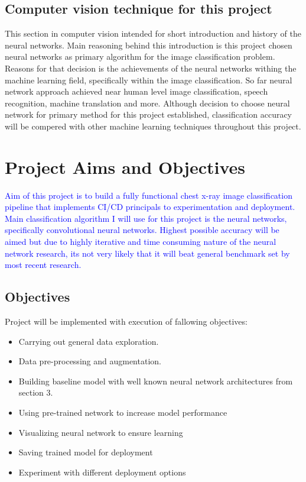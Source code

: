 \documentclass[12pt, twoside, a4paper]{article}
\begin{document}
\subsection{Computer vision technique for this project}
This section in computer vision intended for short introduction and history of the neural networks. Main reasoning behind this introduction is this project chosen neural networks as primary algorithm for the image classification problem. Reasons for that decision is the achievements of the neural networks withing the machine learning field, specifically within the image classification. So far neural network approach achieved near human level image classification, speech recognition, machine translation and more. Although decision to choose neural network for primary method for this project established, classification accuracy will be compered with other machine learning techniques throughout this project.
\clearpage

\section{Project Aims and Objectives}
\textcolor{blue}{Aim of this project is to build a fully functional chest x-ray image classification pipeline that implements CI/CD principals to experimentation and deployment. Main classification algorithm I will use for this project is the neural networks, specifically convolutional neural networks. Highest possible accuracy will be aimed but due to highly iterative and time consuming nature of the neural network research, its not very likely that it will beat general benchmark set by most recent research.}

\subsection{Objectives}
Project will be implemented with execution of fallowing objectives:
\begin{itemize}
    \color{blue}
    \item Carrying out general data exploration.
    \item Data pre-processing and augmentation.
    \item Building baseline model with well known neural network architectures from section 3.
    \item Using pre-trained network to increase model performance
    \item Visualizing neural network to ensure learning 
    \item Saving trained model for deployment
    \item Experiment with different deployment options
\end{itemize}
\clearpage
\end{document}
